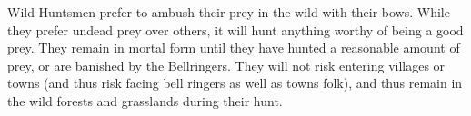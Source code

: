 Wild Huntsmen prefer to ambush their prey in the wild with their bows. While
they prefer undead prey over others, it will hunt anything worthy of being a
good prey. They remain in mortal form until they have hunted a reasonable
amount of prey, or are banished by the Bellringers. They will not risk
entering villages or towns (and thus risk facing bell ringers as well as towns
folk), and thus remain in the wild forests and grasslands during their hunt.
